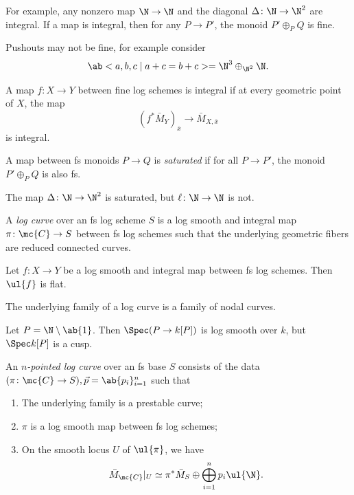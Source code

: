 For example, any nonzero map \(\N \to \N\) and the diagonal \(\Delta \colon\N \to \N^2\) are integral. If a map is integral, then for any \(P \to P'\), the monoid \(P' \oplus_P Q\) is fine.

\begin{exm}
    Pushouts may not be fine, for example consider
    \[ \ab< a ,b,c \mid a+c=b+c> = \N^3 \oplus_{\N^2} \N. \]
\end{exm}

\begin{defn}
    A map \(f \colon X \to Y\) between fine log schemes is integral if at every geometric point of \(X\), the map
    \[ (f^*\bar{M}_Y)_{\bar{x}} \to \bar{M}_{X,\bar{x}} \]
    is integral.
\end{defn}

\begin{defn}
    A map between fs monoids \(P \to Q\) is \textit{saturated} if for all \(P \to P'\), the monoid \(P' \oplus_P Q\) is also fs.
\end{defn}

\begin{exm}
    The map \(\Delta \colon \N \to \N^2\) is saturated, but \(\ell \colon \N \to \N\) is not.
\end{exm}

\begin{defn}
    A \textit{log curve} over an fs log scheme \(S\) is a log smooth and integral map \(\pi \colon \mc{C} \to S\) between fs log schemes such that the underlying geometric fibers are reduced connected curves.
\end{defn}

\begin{prop}
    Let \(f \colon X \to Y\) be a log smooth and integral map between fs log schemes. Then \(\ul{f}\) is flat.
\end{prop}

\begin{thm}
    The underlying family of a log curve is a family of nodal curves.
\end{thm}

\begin{exm}
    Let \(P = \N \setminus \ab\{1\}\). Then \(\Spec (P \to k[P])\) is log smooth over \(k\), but \(\Spec k[P]\) is a cusp.
\end{exm}

\begin{defn}
    An \textit{\(n\)-pointed log curve} over an fs base \(S\) consists of the data \((\pi \colon \mc{C} \to S), \vec{p} = \ab\{p_i\}_{i=1}^n\) such that
    \begin{enumerate}
        \item The underlying family is a prestable curve;
        \item \(\pi\) is a log smooth map between fs log schemes;
        \item On the smooth locus \(U\) of \(\ul{\pi}\), we have
            \[ \bar{M}_{\mc{C}}|_U \simeq \pi^* \bar{M}_S \oplus \bigoplus_{i=1}^n p_i \ul{\N}. \]
    \end{enumerate}
\end{defn}


